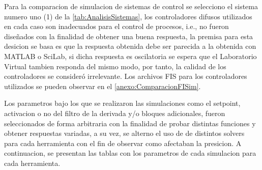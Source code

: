         Para la comparacion de simulacion de sistemas de control se selecciono el sistema numero uno (1) de la \cref{tab:AnalisisSistemas}, los controladores difusos utilizados en cada caso son inadecuados para el control de procesos, i.e., no fueron diseñados con la finalidad de obtener una buena respuesta, la premisa para esta desicion se basa es que la respuesta obtenida debe ser parecida a la obtenida con MATLAB o SciLab, si dicha respuesta es oscilatoria se espera que el Laboratorio Virtual tambien responda del mismo modo, por tanto, la calidad de los controladores se consideró irrelevante. Los archivos FIS para los controladores utilizados se pueden observar en el \ref{anexo:ComparacionFISim}.

        Los parametros bajo los que se realizaron las simulaciones como el setpoint, activacion o no del filtro de la derivada y/o bloques adicionales, fueron seleccionados de forma arbitraria con la finalidad de probar distintas funciones y obtener respuestas variadas, a su vez, se alterno el uso de de distintos solvers para cada herramienta con el fin de observar como afectaban la presicion. A continuacion, se presentan las tablas con los parametros de cada simulacion para cada herramienta.

